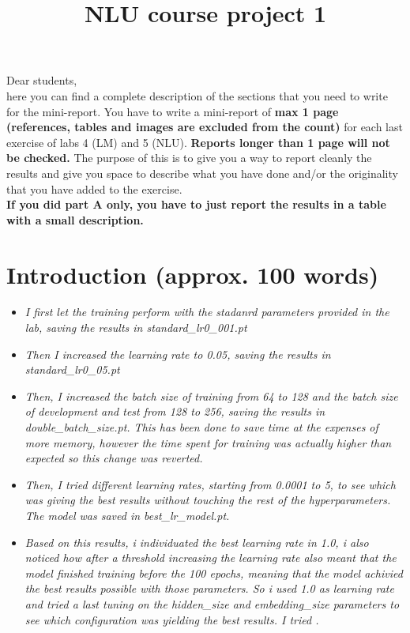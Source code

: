 \documentclass[a4paper]{article}
\title{NLU course project 1}
\begin{document}
\maketitle

Dear students, \\
here you can find a complete description of the sections that you need to write for the mini-report. You have to write a mini-report of \textbf{max 1 page (references, tables and images are excluded from the count)} for each last exercise of labs 4 (LM) and 5 (NLU). \textbf{Reports longer than 1 page will not be checked.} The purpose of this is to give you a way to report cleanly the results and give you space to describe what you have done and/or the originality that you have added to the exercise.
\\
\textbf{If you did part A only, you have to just report the results in a table with a small description.}

\section{Introduction (approx. 100 words)}
\begin{itemize}
    \item \textit{I first let the training perform with the stadanrd parameters provided in the lab, saving the results in standard_lr0_001.pt}
    \item \textit{Then I increased the learning rate to 0.05, saving the results in standard_lr0_05.pt}
    \item \textit{Then, I increased the batch size of training from 64 to 128 and the batch size of development and test from 128 to 256, saving the results in double_batch_size.pt. This has been done to save time at the expenses of more memory, however the time spent for training was actually higher than expected so this change was reverted.}
    \item \textit{Then, I tried different learning rates, starting from 0.0001 to 5, to see which was giving the best results without touching the rest of the hyperparameters. The model was saved in best_lr_model.pt.}
    \item \textit{Based on this results, i individuated the best learning rate in 1.0, i also noticed how after a threshold increasing the learning rate also meant that the model finished training before the 100 epochs, meaning that the model achivied the best results possible with those parameters. So i used 1.0 as learning rate and tried a last tuning on the hidden_size and embedding_size parameters to see which configuration was yielding the best results. I tried  .}
\end{itemize}
\end{document}

